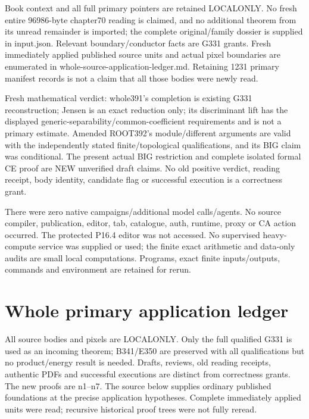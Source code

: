 \documentclass[11pt]{article}
\begin{document}
Book context and all full primary pointers are retained LOCALONLY. No fresh entire 96986-byte chapter70 reading is claimed, and no additional theorem from its unread remainder is imported; the complete original/family dossier is supplied in input.json. Relevant boundary/conductor facts are G331 grants. Fresh immediately applied published source units and actual pixel boundaries are enumerated in whole-source-application-ledger.md. Retaining 1231 primary manifest records is not a claim that all those bodies were newly read.

Fresh mathematical verdict: whole391's completion is existing G331 reconstruction; Jensen is an exact reduction only; its discriminant lift has the displayed generic-separability/common-coefficient requirements and is not a primary estimate. Amended ROOT392's module/different arguments are valid with the independently stated finite/topological qualifications, and its BIG claim was conditional. The present actual BIG restriction and complete isolated formal CE proof are NEW unverified draft claims. No old positive verdict, reading receipt, body identity, candidate flag or successful execution is a correctness grant.

There were zero native campaigns/additional model calls/agents. No source compiler, publication, editor, tab, catalogue, auth, runtime, proxy or CA action occurred. The protected P16.4 editor was not accessed. No supervised heavy-compute service was supplied or used; the finite exact arithmetic and data-only audits are small local computations. Programs, exact finite inputs/outputs, commands and environment are retained for rerun.

\section{Whole primary application ledger}

All source bodies and pixels are LOCALONLY. Only the full qualified G331 is used as an incoming theorem; B341/E350 are preserved with all qualifications but no product/energy result is needed. Drafts, reviews, old reading receipts, authentic PDFs and successful executions are distinct from correctness grants. The new proofs are n1--n7. The source below supplies ordinary published foundations at the precise application hypotheses. Complete immediately applied units were read; recursive historical proof trees were not fully reread.
\end{document}
